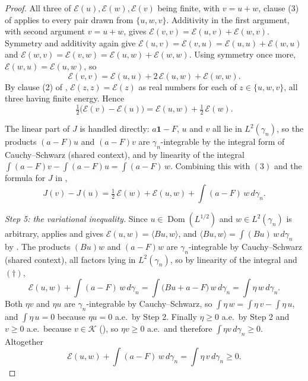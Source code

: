 \begin{proof}
All three of $\mathcal{E}(u), \mathcal{E}(w), \mathcal{E}(v)$ being finite, with
$v = u + w$, clause (3) of  applies to every pair
drawn from $\{u, w, v\}$.  Additivity in the first argument, with second
argument $v = u + w$, gives
$\mathcal{E}(v, v) = \mathcal{E}(u, v) + \mathcal{E}(w, v)$.  Symmetry and
additivity again give
$\mathcal{E}(u, v) = \mathcal{E}(v, u) = \mathcal{E}(u,u) + \mathcal{E}(w,u)$ and
$\mathcal{E}(w, v) = \mathcal{E}(v, w) = \mathcal{E}(u,w) + \mathcal{E}(w,w)$.
Using symmetry once more, $\mathcal{E}(w,u) = \mathcal{E}(u,w)$, so
\[
  \mathcal{E}(v,v) = \mathcal{E}(u,u) + 2\,\mathcal{E}(u,w) + \mathcal{E}(w,w).
\]
By clause (2) of , $\mathcal{E}(z,z) = \mathcal{E}(z)$
as real numbers for each of $z \in \{u, w, v\}$, all three having finite energy.
Hence
\begin{equation*}
  \tfrac12\bigl(\mathcal{E}(v) - \mathcal{E}(u)\bigr)
    = \mathcal{E}(u, w) + \tfrac12\,\mathcal{E}(w). \tag{3}
\end{equation*}

The linear part of $J$ is handled directly: $a\mathbf{1} - F$, $u$ and $v$ all
lie in $L^2(\gamma_n)$, so the products $(a-F)u$ and $(a-F)v$ are
$\gamma_n$-integrable by the integral form of Cauchy--Schwarz (shared context),
and by linearity of the integral
$\int (a-F)v - \int(a-F)u = \int (a-F)\,w$.  Combining this with $(3)$ and the
formula for $J$ in ,
\begin{equation*}
  J(v) - J(u)
    = \tfrac12\,\mathcal{E}(w) + \mathcal{E}(u,w) + \int (a-F)\,w \, d\gamma_n .
  \tag{4}
\end{equation*}

\emph{Step 5: the variational inequality.}
Since $u \in \operatorname{Dom}(L^{1/2})$ and $w \in L^2(\gamma_n)$ is arbitrary,
 applies and gives
$\mathcal{E}(u, w) = \langle Bu, w\rangle$, and
$\langle Bu, w \rangle = \int (Bu)\,w \, d\gamma_n$ by
.  The products $(Bu)w$ and $(a-F)w$ are
$\gamma_n$-integrable by Cauchy--Schwarz (shared context), all factors lying in
$L^2(\gamma_n)$, so by linearity of the integral and $(\dagger)$,
\[
  \mathcal{E}(u,w) + \int (a-F)\,w \, d\gamma_n
    = \int \bigl(Bu + a - F\bigr)\,w \, d\gamma_n
    = \int \eta\, w \, d\gamma_n .
\]
Both $\eta v$ and $\eta u$ are $\gamma_n$-integrable by Cauchy--Schwarz, so
$\int \eta\,w = \int \eta\,v - \int \eta\,u$, and $\int \eta\,u = 0$ because
$\eta u = 0$ a.e.\ by Step 2.  Finally $\eta \geq 0$ a.e.\ by Step 2 and
$v \geq 0$ a.e.\ because $v \in \mathcal{K}$ (), so
$\eta v \geq 0$ a.e.\ and therefore $\int \eta v \, d\gamma_n \geq 0$.  Altogether
\begin{equation*}
  \mathcal{E}(u,w) + \int (a-F)\,w \, d\gamma_n
    = \int \eta\, v \, d\gamma_n \geq 0 . \tag{5}
\end{equation*}


\end{proof}
